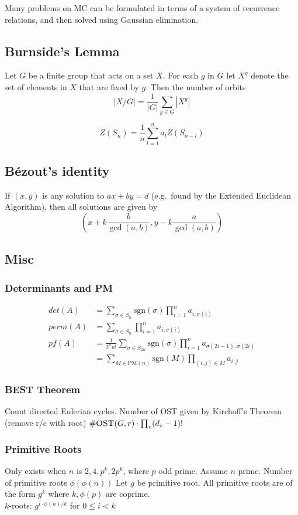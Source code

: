     Many problems on MC can be formulated in terms of a system of
    recurrence relations, and then solved using Gaussian elimination.

  \subsection{Burnside's Lemma}
    Let $G$ be a finite group that acts on a set $X$. For each $g$ in $G$
    let $X^g$ denote the set of elements in $X$ that are fixed by $g$. Then
    the number of orbits \[ |X/G| = \frac{1}{|G|} \sum_{g\in G} |X^g| \]

    \[
        Z(S_n) = \frac{1}{n} \sum_{l=1}^n a_l Z(S_{n-l})
    \]

  \subsection{Bézout's identity}
    If $(x,y)$ is any solution to $ax+by=d$ (e.g.\ found by the Extended
    Euclidean Algorithm), then all solutions are given by \[
    \left(x+k\frac{b}{\gcd(a,b)}, y-k\frac{a}{\gcd(a,b)}\right) \]

  \subsection{Misc}
    \subsubsection{Determinants and PM}
      \begin{align*}
        det(A) &= \sum_{\sigma \in S_n}\text{sgn}(\sigma)\prod_{i = 1}^n a_{i,\sigma(i)}\\
        perm(A) &= \sum_{\sigma \in S_n} \prod_{i = 1}^n a_{i,\sigma(i)}\\
        pf(A) &= \frac{1}{2^nn!}\sum_{\sigma \in S_{2n}} \text{sgn}(\sigma)\prod_{i = 1}^n a_{\sigma(2i-1),\sigma(2i)}\\ &= \sum_{M \in \text{PM}(n)} \text{sgn}(M) \prod_{(i,j) \in M} a_{i,j}
      \end{align*}

    \subsubsection{BEST Theorem}
      Count directed Eulerian cycles. Number of OST given by
      Kirchoff's Theorem (remove r/c with root) $\#\textsc{OST}(G,r)
      \cdot \prod_{v}(d_v-1)!$

    \subsubsection{Primitive Roots}
      Only exists when $n$ is $2, 4, p^k, 2p^k$, where $p$ odd prime. Assume
      $n$ prime. Number of primitive roots $\phi(\phi(n))$
      Let $g$ be primitive root. All primitive roots are of the form $g^k$
      where $k,\phi(p)$ are coprime.\\ $k$-roots:
      $g^{i \cdot \phi(n) / k}$ for $0 \leq i < k$

